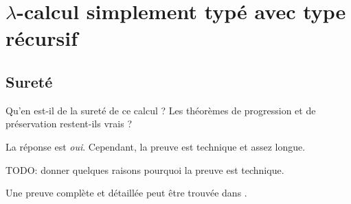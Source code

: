 \chapter{$\lambda$-calcul simplement typé avec type récursif}

\section{Sureté}

Qu'en est-il de la sureté de ce calcul ? Les théorèmes de progression et de
préservation restent-ils vrais ?

La réponse est \textit{oui}. Cependant, la preuve est technique et assez longue.

TODO: donner quelques raisons pourquoi la preuve est technique.

Une preuve complète et détaillée peut être trouvée dans \cite{tapl-recursive-type-metatheory}.